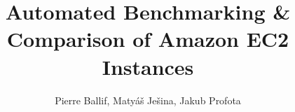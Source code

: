 \documentclass[]{article}
\title{Automated Benchmarking \& Comparison of Amazon EC2 Instances}
\author{Pierre Ballif, Matyáš Ješina, Jakub Profota}
\begin{document}
\begin{comment}
In your report, answer the following questions:
•1) Flask Application Deployment Procedure
•2) Cluster setup using Application Load Balancer
•3) Results of your benchmark
•4) Instructions to run your code

Your assignment will be graded on content as following:
•2 pts: Description of the environment setup and all necessary steps;
•2 pts: Validation of the environment setup;
•6 pts: Results and analysis of your benchmarks;
•3 pts: Automated benchmarking;
•6 pts: Demo;
•1 pts: General presentation and the quality of the report. It is important to
respect the format of the submission. Please use LaTeX!
\end{comment}

\maketitle

\begin{abstract}

\end{abstract}

\section{}
\end{document}
